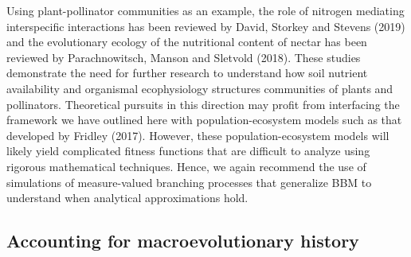 \documentclass[]{elsarticle} %
\begin{document}
Using plant-pollinator communities as an example, the role of nitrogen
mediating interspecific interactions has been reviewed by David, Storkey
and Stevens (2019) and the evolutionary ecology of the nutritional
content of nectar has been reviewed by Parachnowitsch, Manson and
Sletvold (2018). These studies demonstrate the need for further research
to understand how soil nutrient availability and organismal
ecophysiology structures communities of plants and pollinators.
Theoretical pursuits in this direction may profit from interfacing the
framework we have outlined here with population-ecosystem models such as
that developed by Fridley (2017). However, these population-ecosystem
models will likely yield complicated fitness functions that are
difficult to analyze using rigorous mathematical techniques. Hence, we
again recommend the use of simulations of measure-valued branching
processes that generalize BBM to understand when analytical
approximations hold.

\hypertarget{accounting-for-macroevolutionary-history}{%
\subsection{Accounting for macroevolutionary
history}\label{accounting-for-macroevolutionary-history}}
\end{document}
